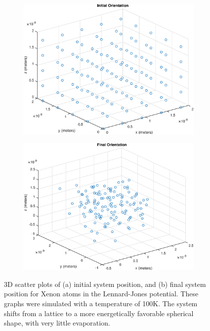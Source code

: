 \documentclass[12pt]{article}
\begin{document}
\begin{figure}[!h]
\begin{subfigure}{0.5\textwidth}
\includegraphics[width=0.9\linewidth]{./finalpics/LJinitial.eps}
\caption{\label{LJinitial}}
\end{subfigure}
\begin{subfigure}{0.5\textwidth}
\includegraphics[width=0.9\linewidth]{./finalpics/LJfinal.eps}
\caption{\label{LJfinal}}
\end{subfigure}
\caption{3D scatter plots of (a) initial system position, and (b) final system position for Xenon atoms in the Lennard-Jones potential.  These graphs were simulated with a temperature of 100K.  The system shifts from a lattice to a more energetically favorable spherical shape, with very little evaporation.} 
\end{figure}
\end{document}
